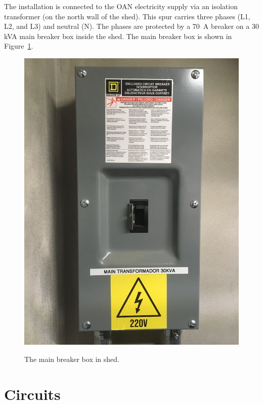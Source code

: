 \ifddotioan
The {\projectname} installation is connected to the OAN electricity supply via an isolation transformer (on the north wall of the shed). This spur carries three phases (L1, L2, and L3) and neutral (N). The phases are protected by a 70~A breaker on a 30 kVA main breaker box inside the shed. The main breaker box is shown in Figure~\ref{figure:main-breaker-box}.

\begin{figure}[t]
\begin{center}
\begin{labeled}{\includegraphics[width=0.45\linewidth,angle=0]{figures/electrical-power-ddoti-main-breaker-box.jpg}}
\end{labeled}
\end{center}
\caption{The main breaker box in shed.}
\label{figure:main-breaker-box}
\end{figure}
\fi

\section{Circuits}

